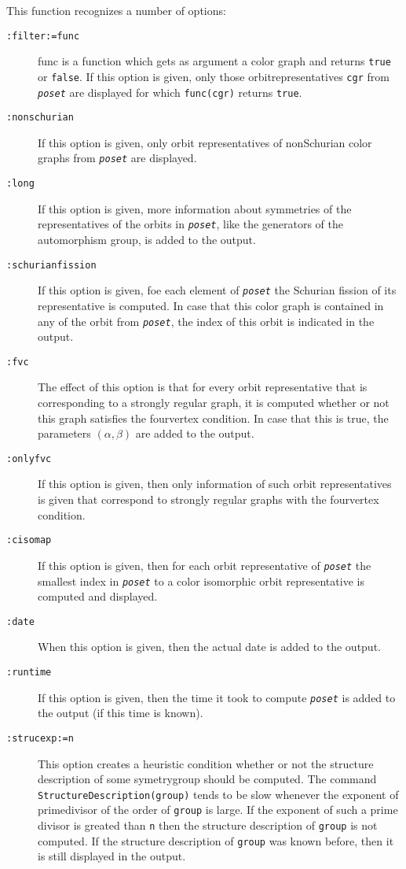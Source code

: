 \documentclass[a4paper,11pt]{report}
\begin{document}
{{{ This function recognizes a number of options: 
\begin{description}
\item[{\texttt{:filter:=func}}]  func is a function which gets as argument a color graph and returns \texttt{true} or \texttt{false}. If this option is given, only those orbit\texttt{}representatives \texttt{cgr} from \mbox{\texttt{\mdseries\slshape poset}} are displayed for which \texttt{func(cgr)} returns \texttt{true}. 
\item[{\texttt{:nonschurian}}]  If this option is given, only orbit representatives of
non\texttt{}Schurian color graphs from \mbox{\texttt{\mdseries\slshape poset}} are displayed. 
\item[{\texttt{:long}}]  If this option is given, more information about symmetries of the
representatives of the orbits in \mbox{\texttt{\mdseries\slshape poset}}, like the generators of the automorphism group, is added to the output. 
\item[{\texttt{:schurianfission}}]  If this option is given, foe each element of \mbox{\texttt{\mdseries\slshape poset}} the Schurian fission of its representative is computed. In case that this
color graph is contained in any of the orbit from \mbox{\texttt{\mdseries\slshape poset}}, the index of this orbit is indicated in the output. 
\item[{\texttt{:fvc}}]  The effect of this option is that for every orbit representative that is
corresponding to a strongly regular graph, it is computed whether or not this
graph satisfies the four\texttt{}vertex condition. In case that
this is true, the parameters $(\alpha,\beta)$ are added to the output. 
\item[{\texttt{:onlyfvc}}]  If this option is given, then only information of such orbit representatives
is given that correspond to strongly regular graphs with the
four\texttt{}vertex condition. 
\item[{\texttt{:cisomap}}]  If this option is given, then for each orbit representative of \mbox{\texttt{\mdseries\slshape poset}} the smallest index in \mbox{\texttt{\mdseries\slshape poset}} to a color isomorphic orbit representative is computed and displayed. 
\item[{\texttt{:date}}]  When this option is given, then the actual date is added to the output. 
\item[{\texttt{:runtime}}]  If this option is given, then the time it took to compute \mbox{\texttt{\mdseries\slshape poset}} is added to the output (if this time is known). 
\item[{\texttt{:strucexp:=n}}]  This option creates a heuristic condition whether or not the structure
description of some symetry\texttt{}group should be computed. The
command \texttt{StructureDescription(group)} tends to be slow whenever the exponent of prime\texttt{}divisor of
the order of \texttt{group} is large. If the exponent of such a prime divisor is greated than \texttt{n} then the structure description of \texttt{group} is not computed. If the structure description of \texttt{group} was known before, then it is still displayed in the output. 


\end{description}}}}
\end{document}
